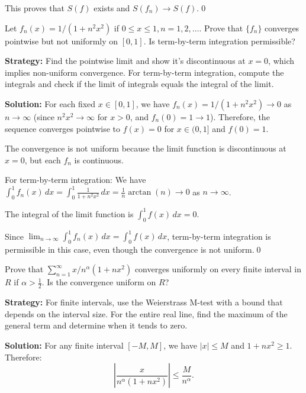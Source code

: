 This proves that \( S(f) \) exists and \( S(f_n) \to S(f) \).\qed


\begin{problembox}
Let \( f_n(x) = 1/(1 + n^2x^2) \) if \( 0 \leq x \leq 1, n = 1, 2, \ldots \). Prove that \(\{f_n\}\) converges pointwise but not uniformly on \([0, 1]\). Is term-by-term integration permissible?
\end{problembox}

\noindent\textbf{Strategy:} Find the pointwise limit and show it's discontinuous at \( x = 0 \), which implies non-uniform convergence. For term-by-term integration, compute the integrals and check if the limit of integrals equals the integral of the limit.

\bigskip\noindent\textbf{Solution:} For each fixed \( x \in [0, 1] \), we have \( f_n(x) = 1/(1 + n^2x^2) \to 0 \) as \( n \to \infty \) (since \( n^2x^2 \to \infty \) for \( x > 0 \), and \( f_n(0) = 1 \to 1 \)). Therefore, the sequence converges pointwise to \( f(x) = 0 \) for \( x \in (0, 1] \) and \( f(0) = 1 \).

The convergence is not uniform because the limit function is discontinuous at \( x = 0 \), but each \( f_n \) is continuous.

For term-by-term integration: We have \( \int_0^1 f_n(x) \, dx = \int_0^1 \frac{1}{1 + n^2x^2} \, dx = \frac{1}{n} \arctan(n) \to 0 \) as \( n \to \infty \).

The integral of the limit function is \( \int_0^1 f(x) \, dx = 0 \).

Since \( \lim_{n \to \infty} \int_0^1 f_n(x) \, dx = \int_0^1 f(x) \, dx \), term-by-term integration is permissible in this case, even though the convergence is not uniform.\qed


\begin{problembox}
Prove that \(\sum_{n=1}^{\infty} x/n^\alpha (1 + nx^2)\) converges uniformly on every finite interval in \( R \) if \( \alpha > \frac{1}{2} \). Is the convergence uniform on \( R \)?
\end{problembox}

\noindent\textbf{Strategy:} For finite intervals, use the Weierstrass M-test with a bound that depends on the interval size. For the entire real line, find the maximum of the general term and determine when it tends to zero.

\bigskip\noindent\textbf{Solution:} For any finite interval \([-M, M]\), we have \( |x| \leq M \) and \( 1 + nx^2 \geq 1 \). Therefore:
\[\left|\frac{x}{n^\alpha (1 + nx^2)}\right| \leq \frac{M}{n^\alpha}.\]

